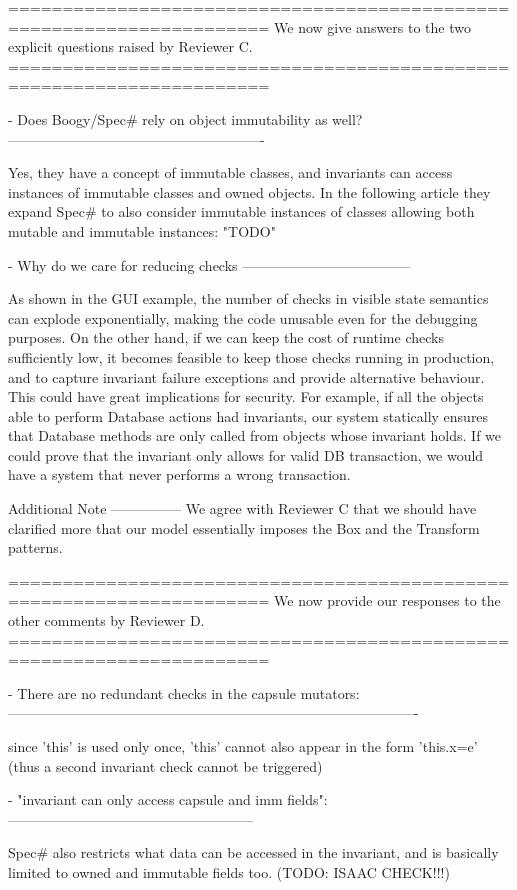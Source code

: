 ======================================================================
We now give answers to the two explicit questions raised by Reviewer C.
======================================================================

- Does Boogy/Spec# rely on object immutability as well?
-------------------------------------------------------

Yes, they have a concept of immutable classes, and invariants can access instances of
immutable classes and owned objects. In the following article they expand Spec# to also
consider immutable instances of classes allowing both mutable and immutable instances: "TODO"

- Why do we care for reducing checks
------------------------------------

As shown in the GUI example, the number of checks in visible state semantics can explode
exponentially, making the code unusable even for the debugging purposes.
On the other hand, if we can keep the cost of runtime checks sufficiently low,
it becomes feasible to keep those checks running in production,
and to capture invariant failure exceptions and provide alternative behaviour.
This could have great implications for security.
For example, if all the objects able to perform Database actions had invariants,
our system statically ensures that Database methods are only called from objects whose invariant holds.
If we could prove that the invariant only allows for valid DB transaction, we would have a system
that never performs a wrong transaction.

Additional Note
---------------
We agree with Reviewer C that we should have clarified more that our model essentially imposes the Box and the Transform patterns.

======================================================================
We now provide our responses to the other comments by Reviewer D.
======================================================================

- There are no redundant checks in the capsule mutators:
----------------------------------------------------------------------------------------

 since 'this' is used only once, 'this' cannot also appear in the form 'this.x=e' (thus a second invariant check cannot be triggered)

- "invariant can only access capsule and imm fields":
-----------------------------------------------------

Spec# also restricts what data can be accessed in the invariant, and is basically limited
to owned and immutable fields too. (TODO: ISAAC CHECK!!!)


